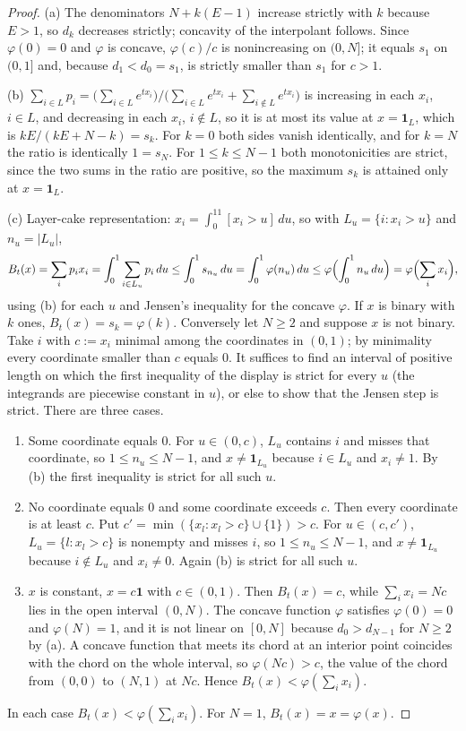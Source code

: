 \documentclass[11pt]{article}
\theoremstyle{plain}
\theoremstyle{definition}
\theoremstyle{remark}
\begin{document}
\begin{proof}
(a) The denominators $N+k(E-1)$ increase strictly with $k$ because $E>1$, so $d_k$ decreases strictly; concavity of the interpolant follows. Since $\varphi(0)=0$ and $\varphi$ is concave, $\varphi(c)/c$ is nonincreasing on $(0,N]$; it equals $s_1$ on $(0,1]$ and, because $d_1<d_0=s_1$, is strictly smaller than $s_1$ for $c>1$.

(b) $\sum_{i\in L}p_i=\bigl(\sum_{i\in L}e^{tx_i}\bigr)/\bigl(\sum_{i\in L}e^{tx_i}+\sum_{i\notin L}e^{tx_i}\bigr)$ is increasing in each $x_i$, $i\in L$, and decreasing in each $x_i$, $i\notin L$, so it is at most its value at $x=\mathbf 1_L$, which is $kE/(kE+N-k)=s_k$. For $k=0$ both sides vanish identically, and for $k=N$ the ratio is identically $1=s_N$. For $1\le k\le N-1$ both monotonicities are strict, since the two sums in the ratio are positive, so the maximum $s_k$ is attained only at $x=\mathbf 1_L$.

(c) Layer-cake representation: $x_i=\int_0^11[x_i>u]\,du$, so with $L_u=\{i:x_i>u\}$ and $n_u=|L_u|$,
\[
 B_t(x)=\sum_ip_ix_i=\int_0^1\sum_{i\in L_u}p_i\,du\le\int_0^1s_{n_u}\,du=\int_0^1\varphi(n_u)\,du\le\varphi\Bigl(\int_0^1n_u\,du\Bigr)=\varphi\Bigl(\sum_ix_i\Bigr),
\]
using (b) for each $u$ and Jensen's inequality for the concave $\varphi$. If $x$ is binary with $k$ ones, $B_t(x)=s_k=\varphi(k)$. Conversely let $N\ge2$ and suppose $x$ is not binary. Take $i$ with $c:=x_i$ minimal among the coordinates in $(0,1)$; by minimality every coordinate smaller than $c$ equals $0$. It suffices to find an interval of positive length on which the first inequality of the display is strict for every $u$ (the integrands are piecewise constant in $u$), or else to show that the Jensen step is strict. There are three cases.
\begin{enumerate}[nosep,label=(\roman*)]
\item Some coordinate equals $0$. For $u\in(0,c)$, $L_u$ contains $i$ and misses that coordinate, so $1\le n_u\le N-1$, and $x\ne\mathbf 1_{L_u}$ because $i\in L_u$ and $x_i\ne1$. By (b) the first inequality is strict for all such $u$.
\item No coordinate equals $0$ and some coordinate exceeds $c$. Then every coordinate is at least $c$. Put $c'=\min(\{x_l:x_l>c\}\cup\{1\})>c$. For $u\in(c,c')$, $L_u=\{l:x_l>c\}$ is nonempty and misses $i$, so $1\le n_u\le N-1$, and $x\ne\mathbf 1_{L_u}$ because $i\notin L_u$ and $x_i\ne0$. Again (b) is strict for all such $u$.
\item $x$ is constant, $x=c\mathbf 1$ with $c\in(0,1)$. Then $B_t(x)=c$, while $\sum_ix_i=Nc$ lies in the open interval $(0,N)$. The concave function $\varphi$ satisfies $\varphi(0)=0$ and $\varphi(N)=1$, and it is not linear on $[0,N]$ because $d_0>d_{N-1}$ for $N\ge2$ by (a). A concave function that meets its chord at an interior point coincides with the chord on the whole interval, so $\varphi(Nc)>c$, the value of the chord from $(0,0)$ to $(N,1)$ at $Nc$. Hence $B_t(x)<\varphi(\sum_ix_i)$.
\end{enumerate}
In each case $B_t(x)<\varphi(\sum_ix_i)$. For $N=1$, $B_t(x)=x=\varphi(x)$.


\end{proof}
\end{document}
